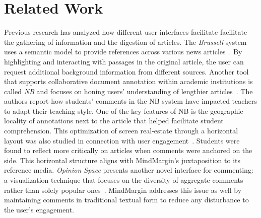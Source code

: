 \section{Related Work}

Previous research has analyzed how different user interfaces facilitate facilitate the gathering of information and the digestion of articles. The \textit{Brussell} system uses a semantic model to provide references across various news articles~\cite{NewsInterfaces}. By highlighting and interacting with passages in the original article, the user can request additional background information from different sources. Another tool that supports collaborative document annotation within academic institutions is called \textit{NB} and focuses on honing users' understanding of lengthier articles~\cite{NB}. The authors report how students' comments in the NB system have impacted teachers to adapt their teaching style. One of the key features of NB is the geographic locality of annotations next to the article that helped facilitate student comprehension. This optimization of screen real-estate through a horizontal layout was also studied in connection with user engagement~\cite{AnnotationsStudents}. Students were found to reflect more critically on articles when comments were anchored on the side. This horizontal structure aligns with MindMargin's juxtaposition to its reference media. \textit{Opinion Space} presents another novel interface for commenting: a visualization technique that focuses on the diversity of aggregate comments rather than solely popular ones~\cite{OpinionSpace}. MindMargin addresses this issue as well by maintaining comments in traditional textual form to reduce any disturbance to the user's engagement. 


